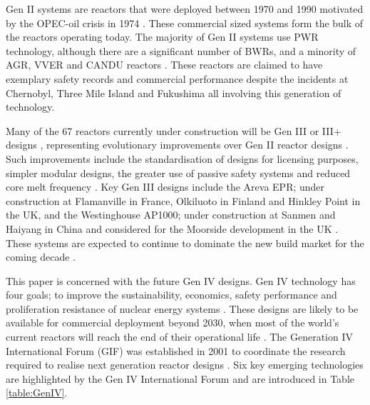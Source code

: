 \documentclass[journal]{IEEEtran}
\begin{document}
Gen II systems are reactors that were deployed between 1970 and 1990 motivated by the OPEC-oil crisis in 1974 \cite{Bhatnagar2011}.
These commercial sized systems form the bulk of the reactors operating today. The majority of Gen II systems use PWR technology, although there are a significant number of BWRs, and a minority of AGR, VVER and CANDU reactors \cite{IAEAReactors2013}. 
These reactors are claimed to have exemplary safety records and commercial performance \cite{Locatelli2013, goldberg2011nuclear, Bhatnagar2011, GenIVRoadmap} despite the incidents at Chernobyl, Three Mile Island and Fukushima all involving this generation of technology.

Many of the 67 reactors currently under construction will be Gen III or III+ designs \cite{IAEAReactors2013}, representing evolutionary improvements over Gen II reactor designs \cite{Marques2010a}. 
Such improvements include the standardisation of designs for licensing purposes, simpler modular designs, the greater use of passive safety systems and reduced core melt frequency \cite{schneider2012nuclear, Marques2010a}. 
Key Gen III designs include the Areva EPR; under construction at Flamanville in France, Olkiluoto in Finland and Hinkley Point in the UK, and the Westinghouse AP1000; under construction at Sanmen and Haiyang in China and considered for the Moorside development in the UK \cite{IAEAReactors2013}.
These systems are expected to continue to dominate the new build market for the coming decade \cite{Marques2010a}.

This paper is concerned with the future Gen IV designs. 
Gen IV technology has four goals; to improve the sustainability, economics, safety performance and proliferation resistance of nuclear energy systems \cite{GenIVRoadmap}. 
These designs are likely to be available for commercial deployment beyond 2030, when most of the world's current reactors will reach the end of their operational life \cite{schneider2012nuclear}. 
The Generation IV International Forum (GIF) was established in 2001 to coordinate the research required to realise next generation reactor designs \cite{GenIVRoadmap}. 
Six key emerging technologies are highlighted by the Gen IV International Forum \cite{GenIVRoadmap} and are introduced in Table \ref{table:GenIV}.
\end{document}

